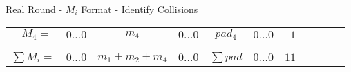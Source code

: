 \begin{frame}{Real Round - $M_i$ Format - Identify Collisions}
{\begin{tabular}{ccccccrllll}
\multicolumn{1}{c|}{$\ \ \ M_4 = $}      & \multicolumn{1}{c|}{$0 \dotsc 0$} & \multicolumn{1}{c|}{$m_4$}             & \multicolumn{1}{c|}{$0 \dotsc 0$} & \multicolumn{1}{c|}{$pad_4$}    & \multicolumn{1}{c|}{$0 \dotsc 0$} & \multicolumn{1}{r|}{$1$}  &  &  &  &  \\ \cline{2-7}
\multicolumn{1}{l}{}               & \multicolumn{1}{l}{}              & \multicolumn{1}{l}{}                   & \multicolumn{1}{l}{}              & \multicolumn{1}{l}{}            & \multicolumn{1}{l}{}              &                           &  &  &  &  \\ %

\cline{1-7}\\
\cline{2-7}
\multicolumn{1}{c|}{$\sum M_i = $} & \multicolumn{1}{c|}{$0 \dotsc 0$} & \multicolumn{1}{c|}{$m_1 + m_2 + m_4$} & \multicolumn{1}{c|}{$0 \dotsc 0$} & \multicolumn{1}{c|}{$\sum pad$} & \multicolumn{1}{c|}{$0 \dotsc 0$} & \multicolumn{1}{r|}{$11$} &  &  &  &  \\ \cline{2-7}
\end{tabular}}

\end{frame}